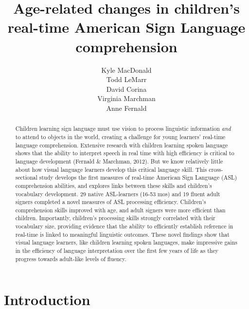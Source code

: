 \documentclass[12pt,]{article}
\title{Age-related changes in children's real-time American Sign Language
comprehension}
\author{Kyle MacDonald \\ Todd LeMarr \\ David Corina \\ Virginia Marchman \\ Anne Fernald}
\date{}
\begin{document}
\maketitle

\begin{abstract}
Children learning sign language must use vision to process linguistic
information \emph{and} to attend to objects in the world, creating a
challenge for young learners' real-time language comprehension.
Extensive research with children learning spoken language shows that the
ability to interpret speech in real time with high efficiency is
critical to language development (Fernald \& Marchman, 2012). But we
know relatively little about how visual language learners develop this
critical language skill. This cross-sectional study develops the first
measures of real-time American Sign Language (ASL) comprehension
abilities, and explores links between these skills and children's
vocabulary development. 29 native ASL-learners (16-53 mos) and 19 fluent
adult signers completed a novel measures of ASL processing efficiency.
Children's comprehension skills improved with age, and adult signers
were more efficient than children. Importantly, children's processing
skills strongly correlated with their vocabulary size, providing
evidence that the ability to efficiently establish reference in
real-time is linked to meaningful linguistic outcomes. These novel
findings show that visual language learners, like children learning
spoken languages, make impressive gains in the efficiency of language
interpretation over the first few years of life as they progress towards
adult-like levels of fluency.
\end{abstract}

\newpage

\section{Introduction}\label{introduction}
\end{document}
